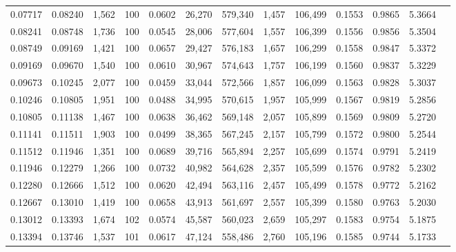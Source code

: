 \begin{tabular}{rrrrrrrrrrrrr}
0.07717 & 0.08240 & 1,562 & 100 &                                     0.0602 &  26,270 & 579,340 &   1,457 & 106,499 & 0.1553 & 0.9865 & 5.3664 \\
0.08241 & 0.08748 & 1,736 & 100 &                                     0.0545 &  28,006 & 577,604 &   1,557 & 106,399 & 0.1556 & 0.9856 & 5.3504 \\
0.08749 & 0.09169 & 1,421 & 100 &                                     0.0657 &  29,427 & 576,183 &   1,657 & 106,299 & 0.1558 & 0.9847 & 5.3372 \\
0.09169 & 0.09670 & 1,540 & 100 &                                     0.0610 &  30,967 & 574,643 &   1,757 & 106,199 & 0.1560 & 0.9837 & 5.3229 \\
0.09673 & 0.10245 & 2,077 & 100 &                                     0.0459 &  33,044 & 572,566 &   1,857 & 106,099 & 0.1563 & 0.9828 & 5.3037 \\
0.10246 & 0.10805 & 1,951 & 100 &                                     0.0488 &  34,995 & 570,615 &   1,957 & 105,999 & 0.1567 & 0.9819 & 5.2856 \\
0.10805 & 0.11138 & 1,467 & 100 &                                     0.0638 &  36,462 & 569,148 &   2,057 & 105,899 & 0.1569 & 0.9809 & 5.2720 \\
0.11141 & 0.11511 & 1,903 & 100 &                                     0.0499 &  38,365 & 567,245 &   2,157 & 105,799 & 0.1572 & 0.9800 & 5.2544 \\
0.11512 & 0.11946 & 1,351 & 100 &                                     0.0689 &  39,716 & 565,894 &   2,257 & 105,699 & 0.1574 & 0.9791 & 5.2419 \\
0.11946 & 0.12279 & 1,266 & 100 &                                     0.0732 &  40,982 & 564,628 &   2,357 & 105,599 & 0.1576 & 0.9782 & 5.2302 \\
0.12280 & 0.12666 & 1,512 & 100 &                                     0.0620 &  42,494 & 563,116 &   2,457 & 105,499 & 0.1578 & 0.9772 & 5.2162 \\
0.12667 & 0.13010 & 1,419 & 100 &                                     0.0658 &  43,913 & 561,697 &   2,557 & 105,399 & 0.1580 & 0.9763 & 5.2030 \\
0.13012 & 0.13393 & 1,674 & 102 &                                     0.0574 &  45,587 & 560,023 &   2,659 & 105,297 & 0.1583 & 0.9754 & 5.1875 \\
0.13394 & 0.13746 & 1,537 & 101 &                                     0.0617 &  47,124 & 558,486 &   2,760 & 105,196 & 0.1585 & 0.9744 & 5.1733 \\

\end{tabular}
